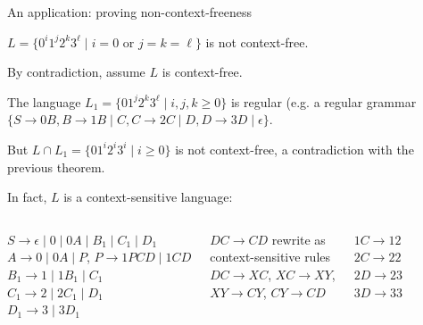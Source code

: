 \documentclass[handout]{beamer}
\begin{document}
\begin{frame}{An application: proving non-context-freeness}

    \begin{example}
        $L=\{0^i1^j2^k3^\ell\mid i=0 \text{ or }j=k=\ell\}$ is not context-free.
    \end{example}
    
    \vspace{-6pt}
    By contradiction, assume $L$ is context-free.

    \smallskip
    The language $L_1=\{01^j2^k3^\ell \mid i,j,k\geq 0\}$ is regular (e.g. a regular grammar $\{S\rightarrow 0B, B\rightarrow 1B\mid C, C\rightarrow 2C\mid D, D\rightarrow 3D\mid\epsilon\}$.

    \smallskip
    But $L\cap L_1=\{01^i2^i3^i\mid i\geq 0\}$ is not context-free, a contradiction with the previous theorem.
    \hfill\qedsymbol

    \vspace{3pt}
    In fact, $L$ is a \alert{context-sensitive} language:    
    
    {\small
    \begin{columns}


        $S\rightarrow \epsilon\mid 0\mid 0A\mid B_1\mid C_1\mid D_1$\\
        $A\rightarrow 0\mid 0A\mid P$, $P\rightarrow 1PCD \mid  1CD$\\
        $B_1\rightarrow 1\mid 1B_1\mid C_1$\\
        $C_1\rightarrow 2\mid 2C_1\mid D_1$\\
        $D_1\rightarrow 3\mid 3D_1$
        

        \alert{$DC\rightarrow CD$} rewrite
        as\\ 
        context-sensitive rules\\
         $DC\rightarrow XC$, $XC\rightarrow XY$,\\ 
         $XY\rightarrow CY$, $CY\rightarrow CD$\\
        \phantom{.}
        

        $1C\rightarrow 12$\\
        $2C\rightarrow 22$\\
        $2D\rightarrow 23$\\
        $3D\rightarrow 33$\\
        \phantom{.}        
        
    \end{columns}
    }

\end{frame}
\end{document}

